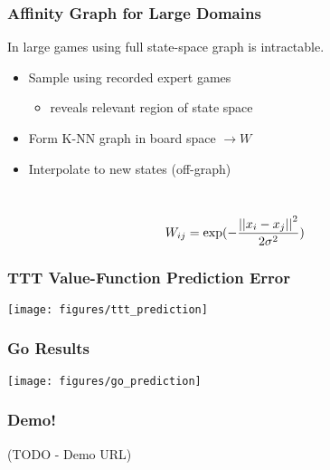 \begin{frame}
\frametitle{Affinity Graph for Large Domains}
In large games using full state-space graph is intractable.
\begin{itemize}
  \item Sample using recorded expert games
    \begin{itemize}
    \item reveals relevant region of state space
    \end{itemize}
  \item Form K-NN graph in board space $\rightarrow W$
  \item Interpolate to new states (off-graph)
\end{itemize} 
\ \\
\begin{equation*}
W_{ij} = \exp(-\frac{\left|\left|x_{i}-x_{j}\right|\right|^2}{2 \sigma^2})
\end{equation*}
\end{frame}

\begin{frame}
\frametitle{TTT Value-Function Prediction Error}
\texttt{[image: figures/ttt\_prediction]}
\end{frame}

\begin{frame}
\frametitle{Go Results} 
\texttt{[image: figures/go\_prediction]}
\end{frame}

\begin{frame}
\frametitle{Demo!} 
(TODO - Demo URL)
\end{frame}


